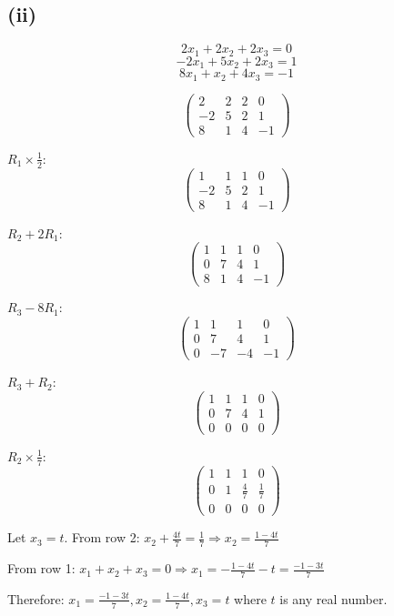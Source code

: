 \subsection*{(ii)}
\[
	2x_1 + 2x_2 + 2x_3 = 0
\]
\[
	-2x_1 + 5x_2 + 2x_3 = 1
\]
\[
	8x_1 + x_2 + 4x_3 = -1
\]

\[
	\begin{pmatrix}
		2  & 2 & 2 & 0  \\
		-2 & 5 & 2 & 1  \\
		8  & 1 & 4 & -1
	\end{pmatrix}
\]

$R_1 \times \frac{1}{2}$:
\[
	\begin{pmatrix}
		1  & 1 & 1 & 0  \\
		-2 & 5 & 2 & 1  \\
		8  & 1 & 4 & -1
	\end{pmatrix}
\]

$R_2 + 2R_1$:
\[
	\begin{pmatrix}
		1 & 1  & 1  & 0  \\
		0 & 7  & 4  & 1  \\
		8  & 1 & 4 & -1
	\end{pmatrix}
\]

$R_3 - 8R_1$:
\[
	\begin{pmatrix}
		1 & 1  & 1  & 0  \\
		0 & 7  & 4  & 1  \\
		0 & -7 & -4 & -1
	\end{pmatrix}
\]

$R_3 + R_2$:
\[
	\begin{pmatrix}
		1 & 1 & 1 & 0 \\
		0 & 7 & 4 & 1 \\
		0 & 0 & 0 & 0
	\end{pmatrix}
\]

$R_2 \times \frac{1}{7}$:
\[
	\begin{pmatrix}
		1 & 1 & 1           & 0           \\
		0 & 1 & \frac{4}{7} & \frac{1}{7} \\
		0 & 0 & 0           & 0
	\end{pmatrix}
\]

Let $x_3 = t$. From row 2: $x_2 + \frac{4t}{7} = \frac{1}{7} \Rightarrow x_2 = \frac{1-4t}{7}$

From row 1: $x_1 + x_2 + x_3 = 0 \Rightarrow x_1 = -\frac{1-4t}{7} - t = \frac{-1-3t}{7}$

Therefore: $x_1 = \frac{-1-3t}{7}, x_2 = \frac{1-4t}{7}, x_3 = t$ where $t$ is any real number.